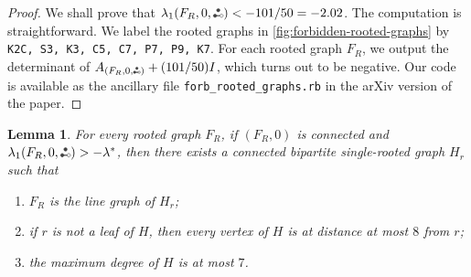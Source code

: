 \documentclass[11pt]{article}
\newtheorem{lemma}[theorem]{Lemma}
\theoremstyle{definition}
\theoremstyle{remark}
\newcommand{\computer}{\tikz[scale=0.28, baseline=0.1ex, transform shape]{\draw[rounded corners=0.02] (0.15, 0.45) rectangle (0.85, 0.85) {};\draw[rounded corners=0.02] (0, 0.3) rectangle (1, 1) {};\draw[rounded corners=0.02] (0, 0) rectangle (1, 0.2) {};\draw (0.2,0.1) -- (0.3,0.1);\draw (0.5,0.1) -- (0.8,0.1);}}
\newenvironment{cproof}[1][Proof]{\begin{proof}[#1]\renewcommand*{\qedsymbol}{\(\computer\)}}{\end{proof}}
\newcommand{\la}{\lambda}
\newcommand{\las}{\lambda^*}
\newcommand{\etwo}{\tikz[baseline=-0.2ex, scale=0.9]{\draw[darkgray, thick] (0,0)--(0.2,0); \draw[darkgray, fill=darkgray] (0,0) circle (0.05); \draw[darkgray, fill=darkgray] (0.1,0.17320508075) circle (0.05); \draw[darkgray, fill=white] (0.2,0) circle (0.05);}}
\newcommand{\ape}[1]{(#1,\etwo)}
\newcommand{\apesub}[1]{(#1,{\tikz[baseline=-0.2ex, scale=0.63]{\draw[darkgray, thick] (0,0)--(0.2,0); \draw[darkgray, fill=darkgray] (0,0) circle (0.05); \draw[darkgray, fill=darkgray] (0.1,0.17320508075) circle (0.05); \draw[darkgray, fill=white] (0.2,0) circle (0.05);}})}
\begin{document}
\begin{cproof}
    We shall prove that $\la_1\ape{F_R, 0} < -101/50 = -2.02$. The computation is straightforward. We label the rooted graphs in \cref{fig:forbidden-rooted-graphs} by \texttt{K2C, S3, K3, C5, C7, P7, P9, K7}. For each rooted graph $F_R$, we output the determinant of $A_{\apesub{F_R,0}} + (101/50)I$, which turns out to be negative. Our code is available as the ancillary file \texttt{forb\_rooted\_graphs.rb} in the arXiv version of the paper.
\end{cproof}

\begin{lemma} \label{lem:char}
    For every rooted graph $F_R$, if $(F_R, 0)$ is connected and $\la_1\ape{F_R, 0} > -\las$, then there exists a connected bipartite single-rooted graph $H_r$ such that
    \begin{enumerate}[label=(\alph*)]
        \item $F_R$ is the line graph of $H_r$; \label{item:a}
        \item if $r$ is not a leaf of $H$, then every vertex of $H$ is at distance at most $8$ from $r$; \label{item:b}
        \item the maximum degree of $H$ is at most $7$. \label{item:c}
    \end{enumerate}
\end{lemma}
\end{document}
